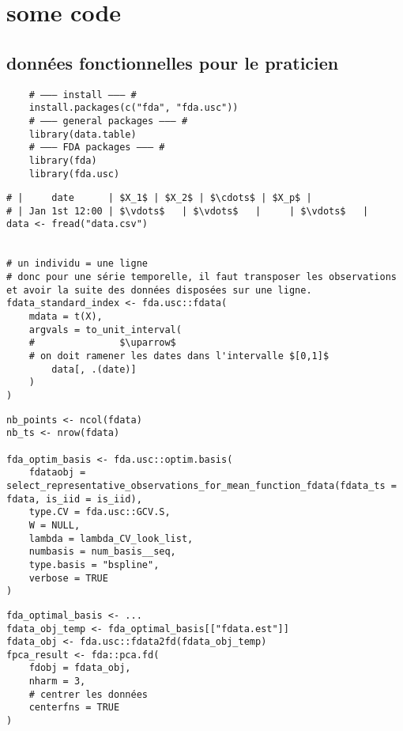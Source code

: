\chapter{some code}

\section*{données fonctionnelles pour le praticien}


\begin{verbatim}
    # ——— install ——— #
    install.packages(c("fda", "fda.usc"))
    # ——— general packages ——— #
    library(data.table)
    # ——— FDA packages ——— #
    library(fda)
    library(fda.usc)
\end{verbatim}


\begin{verbatim} 
# |     date      | $X_1$ | $X_2$ | $\cdots$ | $X_p$ |
# | Jan 1st 12:00 | $\vdots$   | $\vdots$   |     | $\vdots$   |
data <- fread("data.csv")


# un individu = une ligne
# donc pour une série temporelle, il faut transposer les observations et avoir la suite des données disposées sur une ligne.
fdata_standard_index <- fda.usc::fdata(
    mdata = t(X),
    argvals = to_unit_interval(
    #               $\uparrow$
    # on doit ramener les dates dans l'intervalle $[0,1]$
        data[, .(date)]
    )
)
\end{verbatim}

\begin{verbatim}
nb_points <- ncol(fdata)
nb_ts <- nrow(fdata)
 
fda_optim_basis <- fda.usc::optim.basis(
    fdataobj = select_representative_observations_for_mean_function_fdata(fdata_ts = fdata, is_iid = is_iid),
    type.CV = fda.usc::GCV.S,
    W = NULL,
    lambda = lambda_CV_look_list,
    numbasis = num_basis__seq,
    type.basis = "bspline",
    verbose = TRUE
)
\end{verbatim}


\begin{verbatim}
fda_optimal_basis <- ...
fdata_obj_temp <- fda_optimal_basis[["fdata.est"]]
fdata_obj <- fda.usc::fdata2fd(fdata_obj_temp)
fpca_result <- fda::pca.fd(
    fdobj = fdata_obj,
    nharm = 3,
    # centrer les données
    centerfns = TRUE
)
\end{verbatim}


